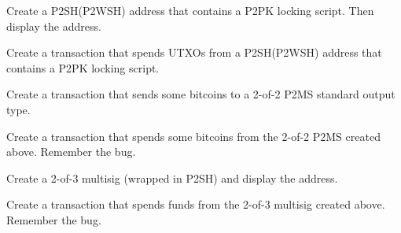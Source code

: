 \begin{exercise}
Create a P2SH(P2WSH) address that contains a P2PK locking script. Then display the address.
\end{exercise}

\begin{exercise}
Create a transaction that spends UTXOs from a P2SH(P2WSH) address that contains a P2PK locking script.
\end{exercise}

\begin{exercise}
Create a transaction that sends some bitcoins to a 2-of-2 P2MS standard output type. 
\end{exercise}

\begin{exercise}
Create a transaction that spends some bitcoins from the 2-of-2 P2MS created above. Remember the  bug.
\end{exercise}

\begin{exercise}
Create a 2-of-3 multisig (wrapped in P2SH) and display the address.
\end{exercise}

\begin{exercise}
Create a transaction that spends funds from the 2-of-3 multisig created above. Remember the  bug.
\end{exercise}

